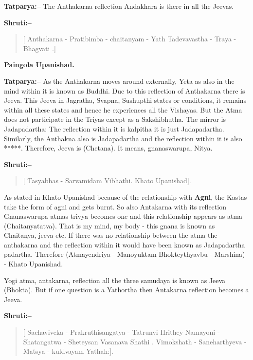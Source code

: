\textbf{Tatparya:–} The Anthakarna reflection Andakhara is there in all the Jeevas.

\textbf{Shruti:–}

\begin{verse}
[ Anthakarna - Pratibimba - chaitanyam - Yath Tadevavastha - Traya - Bhagvati .]
\end{verse}

\begin{flushright}
\textbf{Paingola Upanishad.}
\end{flushright}

\textbf{Tatparya:–} As the Anthakarna moves around externally, Yeta as also in the mind within it is known as Buddhi. Due to this reflection of Anthakarna there is Jeeva. This Jeeva in Jagratha, Svapna, Sushupthi states or conditions, it remains within all these states and hence he experiences all the Vishayas. But the Atma does not participate in the Triyas except as a Sakshibhutha. The mirror is Jadapadartha: The reflection within it is kalpitha it is just Jadapadartha. Similarly, the Anthakna also is Jadapadartha and the reflection within it is also *****. Therefore, Jeeva is (Chetana). It means, gnanaswarupa, Nitya.

\textbf{Shruti:–}

\begin{verse}
[ Tasyabhas - Sarvamidam Vibhathi. Khato Upanishad].
\end{verse}

As stated in Khato Upanishad because of the relationship with \textbf{Agni}, the Kastas take the form of agni and gets burnt. So also Antakarna with its reflection Gnanaswarupa atmas trivya becomes one and this relationship appears as atma (Chaitanyatatva). That is my mind, my body - this gnana is known as Chaitanya, jeeva etc. If there was no relationship between the atma the anthakarna and the reflection within it would have been known as Jadapadartha padartha. Therefore (Atmayendriya - Manoyuktam Bhokteythyavbu - Marshina) - Khato Upanishad.

Yogi atma, antakarna, reflection all the three samudaya is known as Jeeva (Bhokta). But if one question is a Yathortha then Antakarna reflection becomes a Jeeva.

\textbf{Shruti:–}

\begin{verse}
[ Sachaviveka - Prakruthisangatya - Tatrunvi Hri\break they  Namayoni - Shatangatwa - Sheteysan Vasa\break nava Shathi . Vimokshath - Saneharthyeva - Matsya - kuldvayam Yathah:].
\end{verse}


